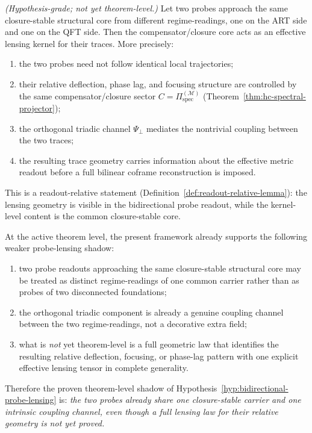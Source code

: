 \begin{proposition}
\label{hyp:bidirectional-probe-lensing}
\emph{(Hypothesis-grade; not yet theorem-level.)}
Let two probes approach the same closure-stable structural core from
different regime-readings, one on the ART side and one on the QFT side.
Then the compensator/closure core acts as an effective lensing kernel
for their traces. More precisely:
\begin{enumerate}[label=(\roman*)]
  \item the two probes need not follow identical local trajectories;
  \item their relative deflection, phase lag, and focusing structure are
        controlled by the same compensator/closure sector
        $C = \Pi^{(\mathcal{M})}_{\mathrm{spec}}$
        (Theorem~\ref{thm:hc-spectral-projector});
  \item the orthogonal triadic channel $\Psi_\perp$ mediates the
        nontrivial coupling between the two traces;
  \item the resulting trace geometry carries information about the
        effective metric readout before a full bilinear coframe
        reconstruction is imposed.
\end{enumerate}
This is a readout-relative statement
(Definition~\ref{def:readout-relative-lemma}): the lensing geometry is
visible in the bidirectional probe readout, while the kernel-level
content is the common closure-stable core.
\end{proposition}

\begin{theorem}
\label{thm:theorem-level-shadow-bidirectional-probe-lensing}
At the active theorem level, the present framework already supports the following weaker probe-lensing shadow:
\begin{enumerate}[leftmargin=2em,label=(\roman*)]
  \item two probe readouts approaching the same closure-stable structural core may be treated as distinct regime-readings of one common carrier rather than as probes of two disconnected foundations;
  \item the orthogonal triadic component is already a genuine coupling channel between the two regime-readings, not a decorative extra field;
  \item what is \emph{not} yet theorem-level is a full geometric law that identifies the resulting relative deflection, focusing, or phase-lag pattern with one explicit effective lensing tensor in complete generality.
\end{enumerate}
Therefore the proven theorem-level shadow of Hypothesis~\ref{hyp:bidirectional-probe-lensing} is:
\emph{the two probes already share one closure-stable carrier and one intrinsic coupling channel, even though a full lensing law for their relative geometry is not yet proved.}
\end{theorem}

